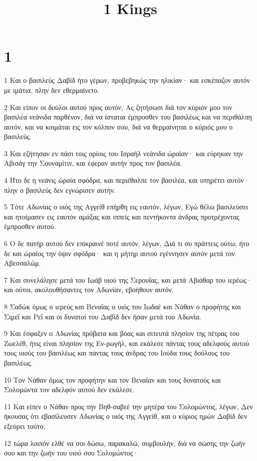 

\title{1 Kings}


\chapter{1}

\par 1 Και ο βασιλεύς Δαβίδ ήτο γέρων, προβεβηκώς την ηλικίαν· και εσκέπαζον αυτόν με ιμάτια, πλην δεν εθερμαίνετο.
\par 2 Και είπον οι δούλοι αυτού προς αυτόν, Ας ζητήσωσι διά τον κύριόν μου τον βασιλέα νεάνιδα παρθένον, διά να ίσταται έμπροσθεν του βασιλέως και να περιθάλπη αυτόν, και να κοιμάται εις τον κόλπον σου, διά να θερμαίνηται ο κύριός μου ο βασιλεύς.
\par 3 Και εζήτησαν εν πάσι τοις ορίοις του Ισραήλ νεάνιδα ώραίαν· και εύρηκαν την Αβισάγ την Σουναμίτιν, και έφεραν αυτήν προς τον βασιλέα.
\par 4 Ήτο δε η νεάνις ώραία σφόδρα, και περιέθαλπε τον βασιλέα, και υπηρέτει αυτόν· πλην ο βασιλεύς δεν εγνώρισεν αυτήν.
\par 5 Τότε Αδωνίας ο υιός της Αγγείθ επήρθη εις εαυτόν, λέγων, Εγώ θέλω βασιλεύσει και ητοίμασεν εις εαυτόν αμάξας και ιππείς και πεντήκοντα άνδρας προτρέχοντας έμπροσθεν αυτού.
\par 6 Ο δε πατήρ αυτού δεν επίκραινέ ποτέ αυτόν, λέγων, Διά τι συ πράττεις ούτω; ήτο δε και ώραίος την όψιν σφόδρα· και η μήτηρ αυτού εγέννησεν αυτόν μετά τον Αβεσσαλώμ.
\par 7 Και συνελάλησε μετά του Ιωάβ υιού της Σερουΐας, και μετά Αβιάθαρ του ιερέως· και ούτοι, ακολουθήσαντες τον Αδωνίαν, εβοήθουν αυτόν.
\par 8 Σαδώκ όμως ο ιερεύς και Βεναΐας ο υιός του Ιωδαέ και Νάθαν ο προφήτης και Σιμεΐ και Ρεΐ και οι δυνατοί του Δαβίδ δεν ήσαν μετά του Αδωνία.
\par 9 Και έσφαξεν ο Αδωνίας πρόβατα και βόας και σιτευτά πλησίον της πέτρας του Ζωελέθ, ήτις είναι πλησίον της Εν-ρωγήλ, και εκάλεσε πάντας τους αδελφούς αυτού τους υιούς του βασιλέως και πάντας τους άνδρας του Ιούδα τους δούλους του βασιλέως.
\par 10 Τον Νάθαν όμως τον προφήτην και τον Βεναΐαν και τους δυνατούς και Σολομώντα τον αδελφόν αυτού δεν εκάλεσε.
\par 11 Και είπεν ο Νάθαν προς την Βηθ-σαβεέ την μητέρα του Σολομώντος, λέγων, Δεν ήκουσας ότι εβασίλευσεν Αδωνίας ο υιός της Αγγείθ, και ο κύριος ημών Δαβίδ δεν εξεύρει τούτο;
\par 12 τώρα λοιπόν ελθέ να σοι δώσω, παρακαλώ, συμβουλήν, διά να σώσης την ζωήν σου και την ζωήν του υιού σου Σολομώντος·
